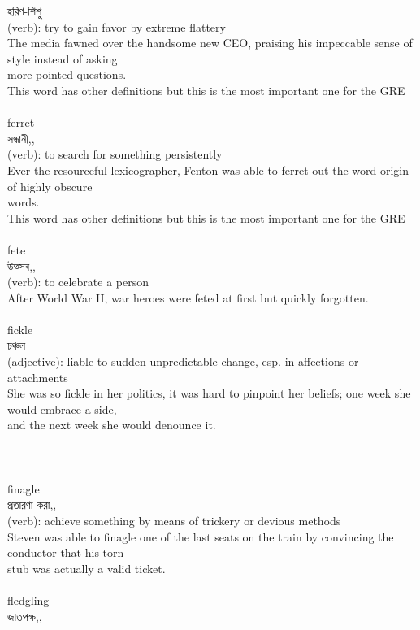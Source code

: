 \documentclass{article}
\begin{document}
{হরিণ-শিশু}\\
{(verb): try to gain favor by extreme flattery\\The media fawned over the handsome new CEO, praising his impeccable sense of style instead of asking\\more pointed questions.\\This word has other definitions but this is the most important one for the GRE\\}\\
{ferret}\\
{সন্ধানী,,}\\
{(verb): to search for something persistently\\Ever the resourceful lexicographer, Fenton was able to ferret out the word origin of highly obscure\\words.\\This word has other definitions but this is the most important one for the GRE\\}\\
{fete}\\
{উত্সব,,}\\
{(verb): to celebrate a person\\After World War II, war heroes were feted at first but quickly forgotten.\\}\\
{fickle}\\
{চঞ্চল}\\
{(adjective): liable to sudden unpredictable change, esp. in affections or attachments\\She was so fickle in her politics, it was hard to pinpoint her beliefs; one week she would embrace a side,\\and the next week she would denounce it.\\\\                                                                                \\}\\
{finagle}\\
{প্রতারণা করা,,}\\
{(verb): achieve something by means of trickery or devious methods\\Steven was able to finagle one of the last seats on the train by convincing the conductor that his torn\\stub was actually a valid ticket.\\}\\
{fledgling}\\
{জাতপক্ষ,,}\\
\end{document}
